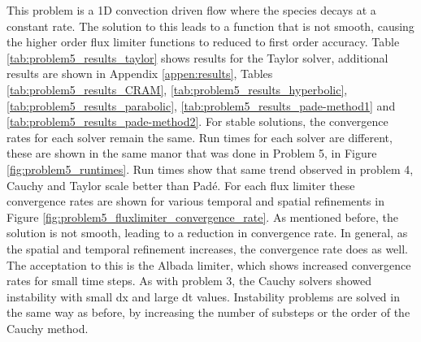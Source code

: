 This problem is a 1D convection driven flow where the species decays at a constant rate. The solution to this leads to a function that is not smooth, causing the higher order flux limiter functions to reduced to first order accuracy. Table \ref{tab:problem5_results_taylor} shows results for the Taylor solver, additional results are shown in Appendix \ref{appen:results}, Tables \ref{tab:problem5_results_CRAM}, \ref{tab:problem5_results_hyperbolic}, \ref{tab:problem5_results_parabolic}, \ref{tab:problem5_results_pade-method1} and \ref{tab:problem5_results_pade-method2}. For stable solutions, the convergence rates for each solver remain the same. Run times for each solver are different, these are shown in the same manor that was done in Problem 5, in Figure \ref{fig:problem5_runtimes}. Run times show that same trend observed in problem 4, Cauchy and Taylor scale better than Pad\'e. For each flux limiter these convergence rates are shown for various temporal and spatial refinements in Figure \ref{fig:problem5_fluxlimiter_convergence_rate}. As mentioned before, the solution is not smooth, leading to a reduction in convergence rate. In general, as the spatial and temporal refinement increases, the convergence rate does as well. The acceptation to this is the Albada limiter, which shows increased convergence rates for small time steps. As with problem 3, the Cauchy solvers showed instability with small dx and large dt values. Instability problems are solved in the same way as before, by increasing the number of substeps or the order of the Cauchy method. 

\clearpage

